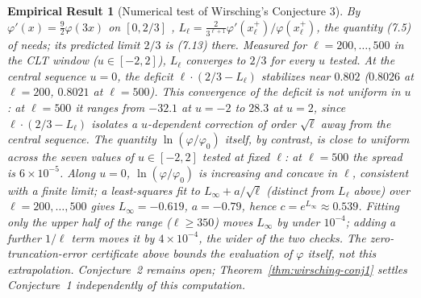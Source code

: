 \documentclass[11pt]{article}
\newtheorem{empirical}[theorem]{Empirical Result}
\theoremstyle{remark}
\begin{document}
\begin{empirical}[Numerical test of Wirsching's Conjecture 3]
\label{thm:conjecture3}
By $\varphi'(x)=\tfrac92\varphi(3x)$ on $[0,2/3]$
\cite[eq.~(7.7)]{Wirsching2003}, $L_\ell=\tfrac{2}{3^{\ell+1}}\varphi'(x_\ell^+)/\varphi(x_\ell^+)$,
the quantity (7.5) of \cite{Wirsching2003} needs; its predicted limit
$2/3$ is (7.13) there. Measured
for $\ell=200,\ldots,500$ in the CLT window ($u\in[-2,2]$), $L_\ell$
converges to $2/3$ for every $u$ tested. At the
central sequence $u=0$, the deficit $\ell\cdot(2/3-L_\ell)$ stabilizes
near $0.802$ ($0.8026$ at $\ell=200$, $0.8021$ at $\ell=500$). This
convergence of the deficit is not uniform in $u$: at $\ell=500$ it
ranges from
$-32.1$ at $u=-2$ to $28.3$ at $u=2$, since
$\ell\cdot(2/3-L_\ell)$ isolates a $u$-dependent correction of order
$\sqrt\ell$ away from the central sequence. The quantity
$\ln(\varphi/\varphi_0)$ itself, by contrast, is close to uniform
across the seven values of $u\in[-2,2]$ tested at fixed $\ell$: at
$\ell=500$ the spread is $6\times10^{-5}$. Along $u=0$,
$\ln(\varphi/\varphi_0)$ is increasing and concave in $\ell$,
consistent with a finite limit; a least-squares fit to
$L_\infty+a/\sqrt\ell$ (distinct from $L_\ell$ above) over
$\ell=200,\ldots,500$ gives $L_\infty=-0.619$,
$a=-0.79$, hence $c=e^{L_\infty}\approx0.539$. Fitting only the upper
half of
the range ($\ell\ge350$) moves $L_\infty$ by under $10^{-4}$; adding a
further $1/\ell$ term moves it by $4\times10^{-4}$, the wider of the
two checks. The
zero-truncation-error certificate above bounds the
evaluation of $\varphi$ itself, not this extrapolation.
Conjecture~2 remains open;
Theorem~\ref{thm:wirsching-conj1} settles Conjecture~1 independently
of this computation.
\end{empirical}
\end{document}
